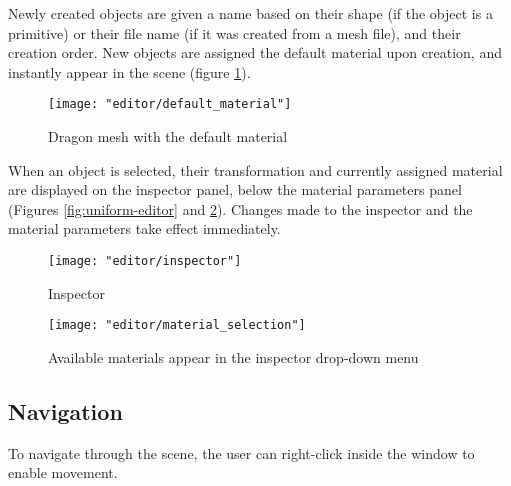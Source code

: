 Newly created objects are given a name based on their shape (if the object is a primitive) or their file name (if it was created from a mesh file), and their creation order. New objects are assigned the default material upon creation, and instantly appear in the scene (figure \ref{fig:default_material}).

\begin{figure}
    \caption{Dragon mesh with the default material}
    \begin{center}
        \texttt{[image: "editor/default\_material"]}
    \end{center}
    \label{fig:default_material}
\end{figure}

When an object is selected, their transformation and currently assigned material are displayed on the inspector panel, below the material parameters panel (Figures \ref{fig:uniform-editor} and \ref{fig:inspector}). Changes made to the inspector and the material parameters take effect immediately.

\begin{figure}
    \caption{Inspector}
    \begin{center}
        \texttt{[image: "editor/inspector"]}
    \end{center}
    \label{fig:inspector}
\end{figure}

\begin{figure}
    \caption{Available materials appear in the inspector drop-down menu}
    \begin{center}
        \texttt{[image: "editor/material\_selection"]}
    \end{center}
    \label{fig:material_selection}
\end{figure}

\subsection{Navigation}
To navigate through the scene, the user can right-click inside the window to enable movement.

